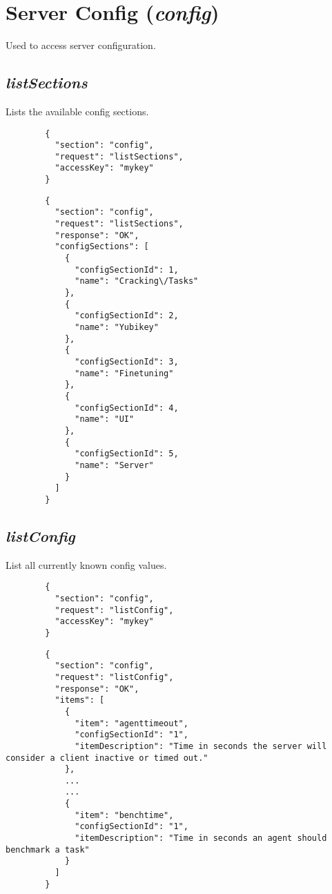 \section*{Server Config (\textit{config})}
	Used to access server configuration.

\subsection*{\textit{listSections}}
	Lists the available config sections.
	{
		\color{blue}
		\begin{verbatim}
		{
		  "section": "config",
		  "request": "listSections",
		  "accessKey": "mykey"
		}
		\end{verbatim}
	}
	{
		\color{OliveGreen}
		\begin{verbatim}
		{
		  "section": "config",
		  "request": "listSections",
		  "response": "OK",
		  "configSections": [
		    {
		      "configSectionId": 1,
		      "name": "Cracking\/Tasks"
		    },
		    {
		      "configSectionId": 2,
		      "name": "Yubikey"
		    },
		    {
		      "configSectionId": 3,
		      "name": "Finetuning"
		    },
		    {
		      "configSectionId": 4,
		      "name": "UI"
		    },
		    {
		      "configSectionId": 5,
		      "name": "Server"
		    }
		  ]
		}
		\end{verbatim}
	}
\subsection*{\textit{listConfig}}
	List all currently known config values.
	{
		\color{blue}
		\begin{verbatim}
		{
		  "section": "config",
		  "request": "listConfig",
		  "accessKey": "mykey"
		}
		\end{verbatim}
	}
	{
		\color{OliveGreen}
		\begin{verbatim}
		{
		  "section": "config",
		  "request": "listConfig",
		  "response": "OK",
		  "items": [
		    {
		      "item": "agenttimeout",
		      "configSectionId": "1",
		      "itemDescription": "Time in seconds the server will consider a client inactive or timed out."
		    },
            ...
            ...
		    {
		      "item": "benchtime",
		      "configSectionId": "1",
		      "itemDescription": "Time in seconds an agent should benchmark a task"
		    }
		  ]
		}
		\end{verbatim}
	}
